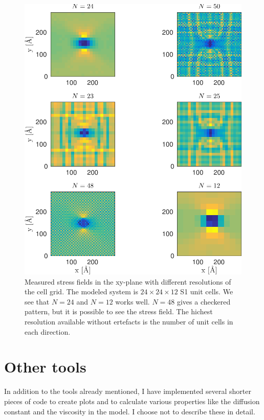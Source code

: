 \begin{figure}
\includegraphics[width=\textwidth]{../figures/thesis/stressfield_artefacts.pdf}
\caption{Measured stress fields in the xy-plane with different resolutions of the cell grid. The modeled system is $24\times 24\times 12$ S1 unit cells. We see that $N=24$ and $N=12$ works well. $N=48$ gives a checkered pattern, but it is possible to see the stress field. The hichest resolution available without ertefacts is the number of unit cells in each direction.}
\label{fig:artefacts}
\end{figure}

\section{Other tools}
In addition to the tools already mentioned, I have implemented several shorter pieces of code to create plots and to calculate various properties like the diffusion constant and the viscosity in the model. I choose not to describe these in detail.
